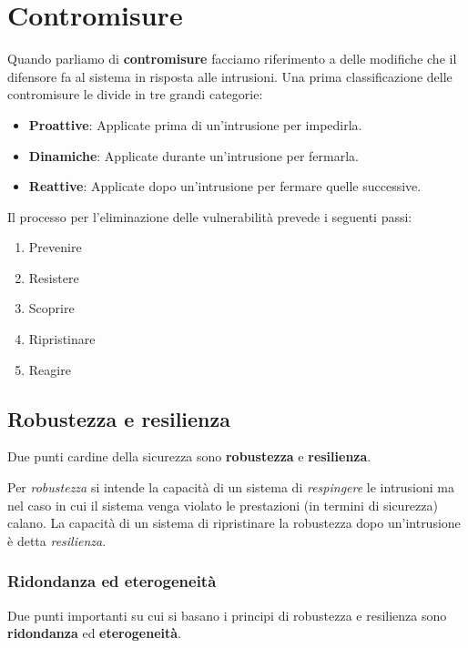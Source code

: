 \chapter{Contromisure}
Quando parliamo di \textbf{contromisure} facciamo riferimento a delle modifiche che il difensore fa al sistema in
risposta alle intrusioni. Una prima classificazione delle contromisure le divide in tre grandi categorie:
\begin{itemize}
	\item \textbf{Proattive}: Applicate prima di un'intrusione per impedirla.
	\item \textbf{Dinamiche}: Applicate durante un'intrusione per fermarla.
	\item \textbf{Reattive}: Applicate dopo un'intrusione per fermare quelle successive.
\end{itemize}
Il processo per l'eliminazione delle vulnerabilità prevede i seguenti passi:
\begin{enumerate}
	\item Prevenire
	\item Resistere
	\item Scoprire
	\item Ripristinare
	\item Reagire
\end{enumerate}

\section{Robustezza e resilienza}
Due punti cardine della sicurezza sono \textbf{robustezza} e \textbf{resilienza}.

Per \emph{robustezza} si intende la capacità di un sistema di \emph{respingere} le intrusioni ma nel caso in cui il
sistema venga violato le prestazioni (in termini di sicurezza) calano. La capacità di un sistema di ripristinare la
robustezza dopo un'intrusione è detta \emph{resilienza}.

\subsection{Ridondanza ed eterogeneità}
Due punti importanti su cui si basano i principi di robustezza e resilienza sono \textbf{ridondanza} ed
\textbf{eterogeneità}.

